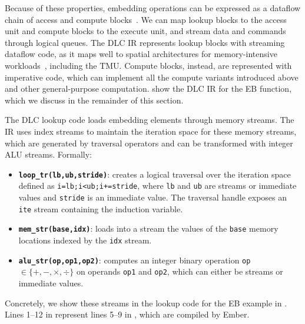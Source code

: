 Because of these properties, embedding operations can be expressed as a dataflow chain of access and compute blocks~\cite{hsu2023asplos}. We can map lookup blocks to the access unit and compute blocks to the execute unit, and stream data and commands through logical queues. The DLC IR represents lookup blocks with streaming dataflow code, as it maps well to spatial architectures for memory-intensive workloads~\cite{hsu2023asplos,yang2021isca,nguyen2022ccpe,parravicini2021dac,sgherzi2021fccm,doerfler2021iwocl,siracusa2022tc}, including the TMU. Compute blocks, instead, are represented with imperative code, which can implement all the compute variants introduced above and other general-purpose computation.  show the DLC IR for the EB function, which we discuss in the remainder of this section.



The DLC lookup code loads embedding elements through memory streams. The IR uses index streams to maintain the iteration space for these memory streams, which are generated by traversal operators and can be transformed with integer ALU streams. Formally:
\begin{itemize}
    \item \textbf{\texttt{loop\_tr(lb,ub,stride)}}: creates a logical traversal over the iteration space defined as \texttt{i=lb;i<ub;i+=stride}, where \texttt{lb} and \texttt{ub} are streams or immediate values and \texttt{stride} is an immediate value. The traversal handle exposes an \texttt{ite} stream containing the induction variable.
    \item \textbf{\texttt{mem\_str(base,idx)}}: loads into a stream the values of the \texttt{base} memory locations indexed by the \texttt{idx} stream.
    \item \textbf{\texttt{alu\_str(op,op1,op2)}}: computes an integer binary operation \texttt{op} $\in \{ +, -, \times, \div \}$ on operands \texttt{op1} and \texttt{op2}, which can either be streams or immediate values.
\end{itemize}
Concretely, we show these streams in the lookup code for the EB example in . Lines 1--12 in  represent lines 5--9 in , which are compiled by Ember.

